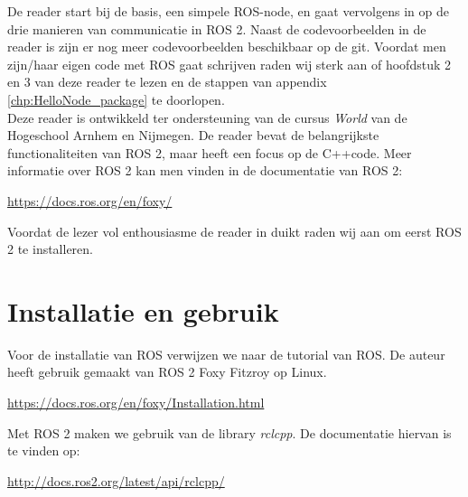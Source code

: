 De reader start bij de basis, een simpele ROS-node, en gaat vervolgens in op de drie manieren van communicatie in ROS 2. Naast de codevoorbeelden in de reader is zijn er nog meer codevoorbeelden beschikbaar op de git. Voordat men zijn/haar eigen code met ROS gaat schrijven raden wij sterk aan of hoofdstuk 2 en 3 van deze reader te lezen en de stappen van appendix \ref{chp:HelloNode_package} te doorlopen.\\

Deze reader is ontwikkeld ter ondersteuning van de cursus \textit{World} van de Hogeschool Arnhem en Nijmegen. De reader bevat de belangrijkste functionaliteiten van ROS 2, maar heeft een focus op de C++code. Meer informatie over ROS 2 kan men vinden in de documentatie van ROS 2:
\begin{center}
    \url{https://docs.ros.org/en/foxy/}
\end{center}

Voordat de lezer vol enthousiasme de reader in duikt raden wij aan om eerst ROS 2 te installeren. 

\section{Installatie en gebruik}
Voor de installatie van ROS verwijzen we naar de tutorial van ROS. De auteur heeft gebruik gemaakt van ROS 2 Foxy Fitzroy op Linux.
\begin{center}
    \url{https://docs.ros.org/en/foxy/Installation.html}
\end{center}

\noindent 

\noindent Met ROS 2 maken we gebruik van de library \textit{rclcpp}. De documentatie hiervan is te vinden op:
\begin{center}
    \url{http://docs.ros2.org/latest/api/rclcpp/}
\end{center}

\vspace{1cm}
